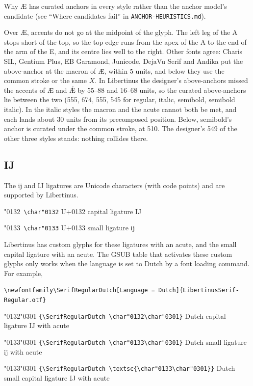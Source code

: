 \documentclass[landscape]{article}
\begin{document}
Why Æ has curated anchors in every style rather than the anchor model's candidate (see ``Where candidates fail'' in \verb|ANCHOR-HEURISTICS.md|).

Over \AE, accents do not go at the midpoint of the glyph. The left leg of the A stops short of the top, so the top edge runs from the apex of the A to the end of the arm of the E, and its centre lies well to the right.
Other fonts agree: Charis SIL, Gentium Plus, EB Garamond, Junicode, DejaVu Serif and Andika put the above-anchor at the macron of Ǣ, within 5 units, and below they use the common stroke or the same $X$.
In Libertinus the designer's above-anchors missed the accents of Ǣ and Ǽ by 55--88 and 16--68 units, so the curated above-anchors lie between the two (555, 674, 555, 545 for regular, italic, semibold, semibold italic).
In the italic styles the macron and the acute cannot both be met, and each lands about 30 units from its precomposed position.
Below, semibold's anchor is curated under the common stroke, at 510. The designer's 549 of the other three styles stands: nothing collides there.

\subsection*{IJ}

The ij and IJ ligatures are Unicode characters (with code points) and are supported by Libertinus.

\char"0132\
\verb|\char"0132| 
U+0132 capital ligature IJ

\char"0133\
\verb|\char"0133|
U+0133 small ligature ij

Libertinus has custom glyphs for these ligatures with an acute, and the small capital ligature with an acute.
The GSUB table that activates these custom glyphs only works when the language is set to Dutch by a font loading command. For example, 

\verb|\newfontfamily\SerifRegularDutch[Language = Dutch]{LibertinusSerif-Regular.otf}|

{\SerifRegularDutch \char"0132\char"0301} 
\verb|{\SerifRegularDutch \char"0132\char"0301}|
Dutch capital ligature IJ with acute

{\SerifRegularDutch \char"0133\char"0301} 
\verb|{\SerifRegularDutch \char"0133\char"0301}|
Dutch small ligature ij with acute

{\SerifRegularDutch\textsc{\char"0133\char"0301}}
\verb|{\SerifRegularDutch \textsc{\char"0133\char"0301}}|
Dutch small capital ligature IJ with acute
\end{document}
